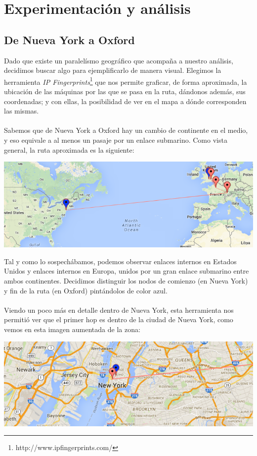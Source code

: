 \section{Experimentación y análisis}

\subsection{De Nueva York a Oxford}

Dado que existe un paralelísmo geográfico que acompaña a nuestro análisis, decidimos buscar algo para ejemplificarlo de manera visual. Elegimos la herramienta \textit{IP Fingerprints}\footnote{http://www.ipfingerprints.com/} que nos permite graficar, de forma aproximada, la ubicación de las máquinas por las que se pasa en la ruta, dándonos además, sus coordenadas; y con ellas, la posibilidad de ver en el mapa a dónde corresponden las mismas.\\
\\
\indent Sabemos que de Nueva York a Oxford hay un cambio de continente en el medio, y eso equivale a al menos un pasaje por un enlace submarino. Como vista general, la ruta aproximada es la siguiente:
\begin{center}
	\includegraphics[scale=0.6]{graphics/new_york-oxford.png}
\end{center}

Tal y como lo sospechábamos, podemos observar enlaces internos en Estados Unidos y enlaces internos en Europa, unidos por un gran enlace submarino entre ambos continentes. Decidimos distinguir los nodos de comienzo (en Nueva York) y fin de la ruta (en Oxford) pintándolos de color azul.\\
\\
\indent Viendo un poco más en detalle dentro de Nueva York, esta herramienta nos permitió ver que el primer hop es dentro de la ciudad de Nueva York, como vemos en esta imagen aumentada de la zona:

\begin{center}
	\includegraphics[scale=0.6]{graphics/new_york_zoom.png}
\end{center}

